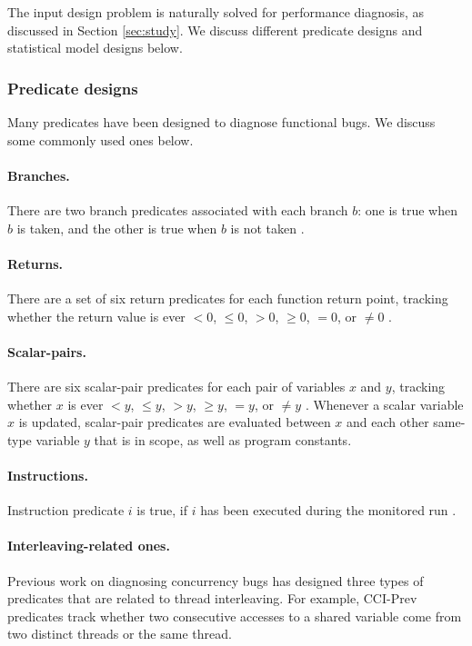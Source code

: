 The input design problem is naturally solved for performance diagnosis, as
discussed in Section \ref{sec:study}. We discuss different predicate designs
and statistical model designs below.

\subsubsection{Predicate designs}
Many predicates have been designed to diagnose functional bugs.
We discuss some commonly used ones below.

\paragraph{Branches.} There are two branch 
predicates associated
with each branch $b$: one is true when $b$ is taken, and the other is true when
$b$ is not taken \cite{liblit03,liblit05}.

\paragraph{Returns.} There are a set of six return predicates
for each function return point, tracking whether the return value is ever
$<0$, $\leq 0$, $>0$, $\geq 0$, $=0$, or $\neq 0$ \cite{liblit03,liblit05}.

\paragraph{Scalar-pairs.} There are six scalar-pair predicates
for each pair of variables $x$ and $y$, tracking whether $x$ is ever 
$<y$, $\leq y$, $>y$, $\geq y$, $=y$, or $\neq y$ \cite{liblit03,liblit05}.
Whenever a scalar
variable $x$ is updated, scalar-pair predicates are evaluated between $x$ and
each other same-type variable $y$ that is in scope, as well as program 
constants.

\paragraph{Instructions.} Instruction predicate $i$ is true, if 
$i$ has been executed during the monitored run 
\cite{tarantula1,tarantula2,tarantula.darko}.

\paragraph{Interleaving-related ones.} Previous work on diagnosing
concurrency bugs \cite{CCI} has designed three types of predicates that are 
related to
thread interleaving. For example, CCI-Prev predicates track whether two 
consecutive accesses to a
shared variable come from two distinct threads or the same thread.

